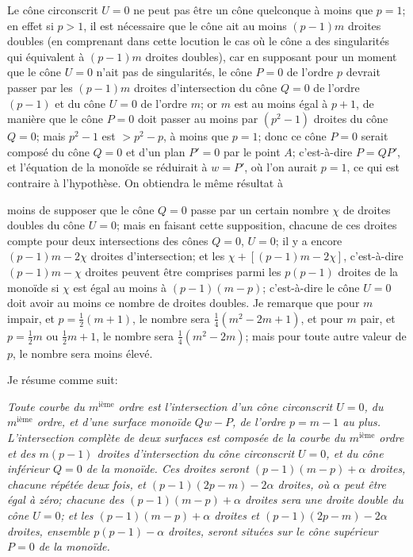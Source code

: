 \documentclass[11pt,a4paper]{article}
\begin{document}
Le c\^{o}ne circonscrit $U = 0$ ne peut pas \^{e}tre un c\^{o}ne quelconque \`{a} moins que $p = 1$; en effet si $p > 1$, il est n\'{e}cessaire que le c\^{o}ne ait au moins $(p-1)m$ droites doubles (en comprenant dans cette locution le cas o\`{u} le c\^{o}ne a des singularit\'{e}s qui \'{e}quivalent \`{a} $(p-1)m$ droites doubles), car en supposant pour un moment que le c\^{o}ne $U = 0$ n'ait pas de singularit\'{e}s, le c\^{o}ne $P = 0$ de l'ordre $p$ devrait passer par les $(p-1)m$ droites d'intersection du c\^{o}ne $Q = 0$ de l'ordre $(p-1)$ et du c\^{o}ne $U = 0$ de l'ordre $m$; or $m$ est au moins \'{e}gal \`{a} $p+1$, de mani\`{e}re que le c\^{o}ne $P = 0$ doit passer au moins par $(p^2 - 1)$ droites du c\^{o}ne $Q = 0$; mais $p^2 - 1$ est $> p^2 - p$, \`{a} moins que $p = 1$; donc ce c\^{o}ne $P = 0$ serait compos\'{e} du c\^{o}ne $Q = 0$ et d'un plan $P' = 0$ par le point $A$; c'est-\`{a}-dire $P = QP'$, et l'\'{e}quation de la mono\"{i}de se r\'{e}duirait \`{a} $w = P'$, o\`{u} l'on aurait $p = 1$, ce qui est contraire \`{a} l'hypoth\`{e}se. On obtiendra le m\^{e}me r\'{e}sultat \`{a}

\clearpage

moins de supposer que le c\^{o}ne $Q = 0$ passe par un certain nombre $\chi$ de droites doubles du c\^{o}ne $U = 0$; mais en faisant cette supposition, chacune de ces droites compte pour deux intersections des c\^{o}nes $Q = 0$, $U = 0$; il y a encore $(p-1)m - 2\chi$ droites d'intersection; et les $\chi + [(p-1)m - 2\chi]$, c'est-\`{a}-dire $(p-1)m - \chi$ droites peuvent \^{e}tre comprises parmi les $p(p-1)$ droites de la mono\"{i}de si $\chi$ est \'{e}gal au moins \`{a} $(p-1)(m-p)$; c'est-\`{a}-dire le c\^{o}ne $U = 0$ doit avoir au moins ce nombre de droites doubles. Je remarque que pour $m$ impair, et $p = \tfrac{1}{2}(m+1)$, le nombre sera $\tfrac{1}{4}(m^2 - 2m + 1)$, et pour $m$ pair, et $p = \tfrac{1}{2}m$ ou $\tfrac{1}{2}m + 1$, le nombre sera $\tfrac{1}{4}(m^2 - 2m)$; mais pour toute autre valeur de $p$, le nombre sera moins \'{e}lev\'{e}.

Je r\'{e}sume comme suit:

\medskip
\noindent\textit{Toute courbe du $m^{\text{i\`{e}me}}$ ordre est l'intersection d'un c\^{o}ne circonscrit $U = 0$, du $m^{\text{i\`{e}me}}$ ordre, et d'une surface mono\"{i}de $Qw - P$, de l'ordre $p = m-1$ au plus. L'intersection compl\`{e}te de deux surfaces est compos\'{e}e de la courbe du $m^{\text{i\`{e}me}}$ ordre et des $m(p-1)$ droites d'intersection du c\^{o}ne circonscrit $U = 0$, et du c\^{o}ne inf\'{e}rieur $Q = 0$ de la mono\"{i}de. Ces droites seront $(p-1)(m-p) + \alpha$ droites, chacune r\'{e}p\'{e}t\'{e}e deux fois, et $(p-1)(2p-m) - 2\alpha$ droites, o\`{u} $\alpha$ peut \^{e}tre \'{e}gal \`{a} z\'{e}ro; chacune des $(p-1)(m-p) + \alpha$ droites sera une droite double du c\^{o}ne $U = 0$; et les $(p-1)(m-p) + \alpha$ droites et $(p-1)(2p-m) - 2\alpha$ droites, ensemble $p(p-1) - \alpha$ droites, seront situ\'{e}es sur le c\^{o}ne sup\'{e}rieur $P = 0$ de la mono\"{i}de.}
\medskip
\end{document}
